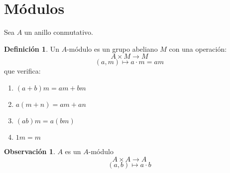 \documentclass{article}
\theoremstyle{theorem-style}  %
\theoremstyle{definition}
\newtheorem{definition}{Definición}[section]
\newtheorem*{observation}{Observación} %
\theoremstyle{example-style}
\begin{document}
\maketitle



\newpage
\tableofcontents
\newpage


\section{Módulos}
	Sea $A$ un anillo conmutativo.
    \begin{definition}
        Un $A$-módulo es un grupo abeliano $M$ con una operación:
        \[A\times M\longrightarrow M \]
        \[(a,m) \longmapsto a\cdot m =am\]
        que verifica:
        \begin{enumerate}[\hspace{1cm}i)]
        	\item $(a+b)m = am+bm$
        	\item $a(m+n)=am+an$
        	\item $(ab)m = a(bm)$
        	\item $1m=m$
        \end{enumerate}
    \end{definition}

    \begin{observation}
    	$A$ es un $A$-módulo
    	\[A\times A\longrightarrow A \]
    	\[(a,b) \longmapsto a\cdot b\]
    \end{observation}
\end{document}
